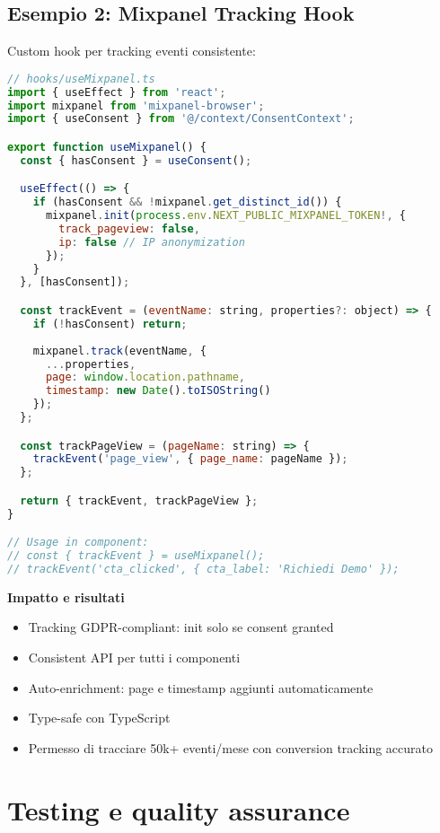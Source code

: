 \subsection{Esempio 2: Mixpanel Tracking Hook}
Custom hook per tracking eventi consistente:

\begin{lstlisting}[language=JavaScript, caption=useMixpanel Hook]
// hooks/useMixpanel.ts
import { useEffect } from 'react';
import mixpanel from 'mixpanel-browser';
import { useConsent } from '@/context/ConsentContext';

export function useMixpanel() {
  const { hasConsent } = useConsent();

  useEffect(() => {
    if (hasConsent && !mixpanel.get_distinct_id()) {
      mixpanel.init(process.env.NEXT_PUBLIC_MIXPANEL_TOKEN!, {
        track_pageview: false,
        ip: false // IP anonymization
      });
    }
  }, [hasConsent]);

  const trackEvent = (eventName: string, properties?: object) => {
    if (!hasConsent) return;
    
    mixpanel.track(eventName, {
      ...properties,
      page: window.location.pathname,
      timestamp: new Date().toISOString()
    });
  };

  const trackPageView = (pageName: string) => {
    trackEvent('page_view', { page_name: pageName });
  };

  return { trackEvent, trackPageView };
}

// Usage in component:
// const { trackEvent } = useMixpanel();
// trackEvent('cta_clicked', { cta_label: 'Richiedi Demo' });
\end{lstlisting}

\textbf{Impatto e risultati}
\begin{itemize}
  \item Tracking GDPR-compliant: init solo se consent granted
  \item Consistent API per tutti i componenti
  \item Auto-enrichment: page e timestamp aggiunti automaticamente
  \item Type-safe con TypeScript
  \item Permesso di tracciare 50k+ eventi/mese con conversion tracking 
        accurato
\end{itemize}

\section{Testing e quality assurance}

